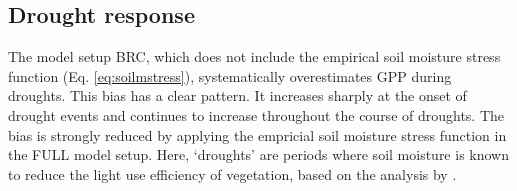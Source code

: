 \documentclass{myreport}
\begin{document}




\subsection{Drought response}
\label{sec:results_droughtresponse}
The model setup BRC, which does not include the empirical soil moisture stress function (Eq. \ref{eq:soilmstress}), systematically overestimates GPP during droughts. This bias has a clear pattern. It increases sharply at the onset of drought events and continues to increase throughout the course of droughts. The bias is strongly reduced by applying the empricial soil moisture stress function in the FULL model setup. Here, `droughts' are periods where soil moisture is known to reduce the light use efficiency of vegetation, based on the analysis by \cite{stocker18newphyt}.  
\end{document}
